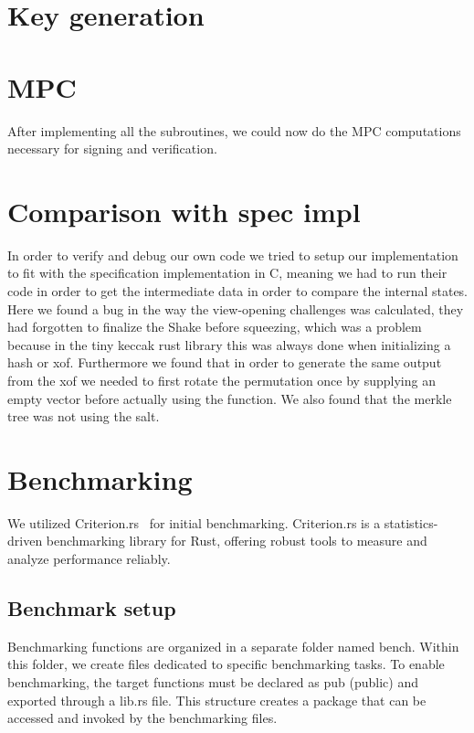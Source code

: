 \documentclass[twoside,11pt]{report}
\theoremstyle{definition}
\theoremstyle{plain}
\begin{document}
\section{Key generation}

\section{MPC}\label{sub:mpc_algo}
After implementing all the subroutines, we could now do the MPC computations necessary for signing and verification.

\section{Comparison with spec impl}\label{sub:comparison_with_spec_impl}
In order to verify and debug our own code we tried to setup our implementation to fit with the specification implementation in C, meaning we had to run their code in order to get the intermediate data in order to compare the internal states.
Here we found a bug in the way the view-opening challenges was calculated, they had forgotten to finalize the Shake before squeezing, which was a problem because in the tiny keccak rust library this was always done when initializing a hash or xof.
Furthermore we found that in order to generate the same output from the xof we needed to first rotate the permutation once by supplying an empty vector before actually using the function.
We also found that the merkle tree was not using the salt.

\section{Benchmarking}\label{sub:benchmarking} %
We utilized Criterion.rs~\cite{criterion} for initial benchmarking. Criterion.rs is a statistics-driven benchmarking library for Rust, offering robust tools to measure and analyze performance reliably.

\subsection{Benchmark setup}
Benchmarking functions are organized in a separate folder named bench. Within this folder, we create files dedicated to specific benchmarking tasks. To enable benchmarking, the target functions must be declared as pub (public) and exported through a lib.rs file. This structure creates a package that can be accessed and invoked by the benchmarking files.
\end{document}
